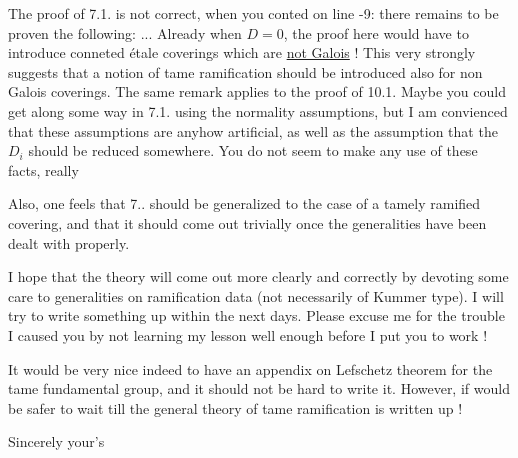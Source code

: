 \normalmarginpar
{}
The proof of 7.1. is not correct, when you conted on line -9: there remains to be proven the following: ... Already when $D=0$, the proof here would have to introduce conneted étale coverings which are \uline{not Galois} ! This very strongly suggests that a notion of tame ramification should be introduced also  for non Galois coverings. The same remark applies to the proof of 10.1. Maybe you could get along some way in 7.1. using the normality assumptions, but I am convienced that these assumptions are anyhow artificial, as well as the assumption that the $D_i$ should be reduced somewhere. You do not seem to make any use of these facts, really

Also, one feels that 7.. should be generalized to the case of a tamely ramified covering, and that it should come out trivially once the generalities have been dealt with properly.

I hope that the theory will come out more clearly and correctly by devoting some care to generalities on ramification data (not necessarily of Kummer type). I will try to write something up within the next days. Please excuse me for the trouble I caused you by not learning my lesson well enough before I put you to work !

It would be very nice indeed to have an appendix on Lefschetz theorem for the tame fundamental group, and it should not be hard to write it. However, if would be safer to wait till the general theory of tame ramification is written up !

Sincerely your's\\
